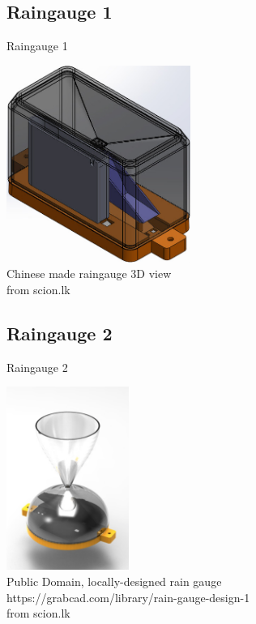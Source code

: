 \documentclass[xcolor=dvipsnames,beamer]{beamer} %
\begin{document}
\subsection{Raingauge 1}
\begin{frame}[fragile]{Raingauge 1}

\begin{center}
 \includegraphics[width=6cm]{MWSv1_rain1}\\
\vspace{5mm}
Chinese made raingauge 3D view\\
from scion.lk
\end{center}

\end{frame}

\subsection{Raingauge 2}
\begin{frame}[fragile]{Raingauge 2}

\begin{center}
 \includegraphics[width=4cm]{oshw_raingauge}\\
\vspace{5mm}
Public Domain, locally-designed rain gauge\\
https://grabcad.com/library/rain-gauge-design-1\\
from scion.lk
\end{center}
\end{frame}
\end{document}
